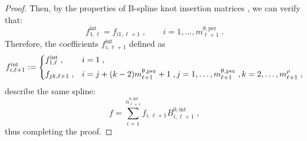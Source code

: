 \documentclass[10pt]{article}
\newcommand{\cU}{\theta}
\newcommand{\cV}{\rho}
\newcommand{\ndofV}{m^\cV}
\newcommand{\bsp}{B}
\newcommand{\per}{\mathrm{per}}
\newcommand{\pndofU}{m^{\cU,\per}}
\newcommand{\tint}{\mathrm{int}}
\theoremstyle{plain}
\theoremstyle{definition}
\theoremstyle{remark}
\begin{document}
\begin{proof}
    Then, by the properties of B-spline knot insertion matrices \cite{deBoor:1978}, we can verify that:
    \begin{equation*}
        f_{1,\ell}^\tint = f_{i1,\ell+1}\;,\qquad i = 1, \dots, \pndofU_{\ell+1}\;.
    \end{equation*}
    Therefore, the coefficients $f_{i,\ell+1}^\tint$ defined as
    \begin{equation}\label{eq:two-scale-intermediate-2}
        f_{i,\ell+1}^\tint := \begin{dcases}
            f_{1,\ell}^\tint\;, & i = 1\;,\\
            f_{jk,\ell+1}\;, & i = j + (k-2)\pndofU_{\ell+1} + 1\;, j = 1, \dots, \pndofU_{\ell+1}\;, k = 2, \dots, \ndofV_{\ell+1}\;,\\
        \end{dcases}
    \end{equation}
    describe the same spline:
    \begin{equation*}
        f = \sum\limits_{i=1}^{n^{0,\tint}_{\ell+1}} f_{i,\ell+1} \bsp^{0,\tint}_{i,\ell+1}\;,
    \end{equation*}
    thus completing the proof.
\end{proof}
\end{document}
